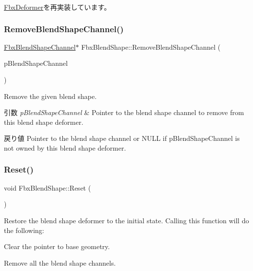 \hyperlink{class_fbx_deformer_ac3f5a3eb2dda62397fc667004d798319}{Fbx\+Deformer}を再実装しています。

\mbox{\label{class_fbx_blend_shape_ae68aaed993da38c536a35a698c5d435a}} 
\subsubsection{\texorpdfstring{Remove\+Blend\+Shape\+Channel()}{RemoveBlendShapeChannel()}}
{\footnotesize\ttfamily \hyperlink{class_fbx_blend_shape_channel}{Fbx\+Blend\+Shape\+Channel}$\ast$ Fbx\+Blend\+Shape\+::\+Remove\+Blend\+Shape\+Channel (\begin{DoxyParamCaption}\item[{\hyperlink{class_fbx_blend_shape_channel}{Fbx\+Blend\+Shape\+Channel} $\ast$}]{p\+Blend\+Shape\+Channel }\end{DoxyParamCaption})}

Remove the given blend shape. 
\begin{DoxyParams}{引数}
{\em p\+Blend\+Shape\+Channel} & Pointer to the blend shape channel to remove from this blend shape deformer. \\
\hline
\end{DoxyParams}
\begin{DoxyReturn}{戻り値}
Pointer to the blend shape channel or {\ttfamily N\+U\+LL} if p\+Blend\+Shape\+Channel is not owned by this blend shape deformer. 
\end{DoxyReturn}
\mbox{\label{class_fbx_blend_shape_ac7076c304c81d96b729188a8f942d84d}} 
\subsubsection{\texorpdfstring{Reset()}{Reset()}}
{\footnotesize\ttfamily void Fbx\+Blend\+Shape\+::\+Reset (\begin{DoxyParamCaption}{ }\end{DoxyParamCaption})}

Restore the blend shape deformer to the initial state. Calling this function will do the following\+: \begin{DoxyItemize}
\item Clear the pointer to base geometry. \item Remove all the blend shape channels. \end{DoxyItemize}
\mbox{\label{class_fbx_blend_shape_aafaf4d30fd6dca540ad6f0f0b1062def}} 
